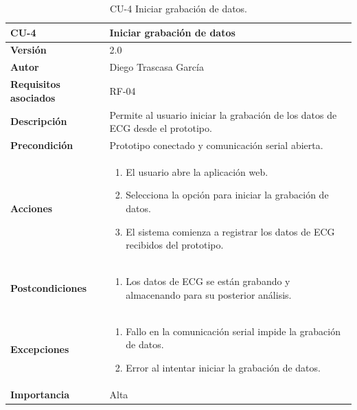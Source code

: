 \begin{table}[p]
	\centering
	\begin{tabularx}{\linewidth}{ p{} p{} }
		\toprule
		\textbf{CU-4}    & \textbf{Iniciar grabación de datos}\\
		\toprule
		\textbf{Versión}              & 2.0    \\
		\textbf{Autor}                & Diego Trascasa García \\
		\textbf{Requisitos asociados} & RF-04 \\
		\textbf{Descripción}          & Permite al usuario iniciar la grabación de los datos de ECG desde el prototipo. \\
		\textbf{Precondición}         & Prototipo conectado y comunicación serial abierta. \\
		\textbf{Acciones}             &
		\begin{enumerate}
			\item El usuario abre la aplicación web.
			\item Selecciona la opción para iniciar la grabación de datos.
			\item El sistema comienza a registrar los datos de ECG recibidos del prototipo.
		\end{enumerate}\\
		\textbf{Postcondiciones}      & 
		\begin{enumerate}
			\item Los datos de ECG se están grabando y almacenando para su posterior análisis.
		\end{enumerate}\\
		\textbf{Excepciones}          & 
		\begin{enumerate}
			\item Fallo en la comunicación serial impide la grabación de datos.
			\item Error al intentar iniciar la grabación de datos.
		\end{enumerate}\\
		\textbf{Importancia}          & Alta \\
		\bottomrule
	\end{tabularx}
	\caption{CU-4 Iniciar grabación de datos.}
    \label{CU-4}
\end{table}


